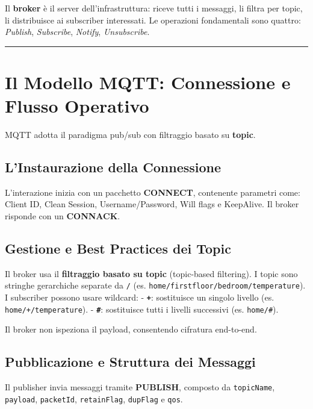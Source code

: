 \documentclass[
  italian,
  openany]{book}
\begin{document}
Il \textbf{broker} è il server dell'infrastruttura: riceve tutti i
messaggi, li filtra per topic, li distribuisce ai subscriber
interessati. Le operazioni fondamentali sono quattro: \emph{Publish},
\emph{Subscribe}, \emph{Notify}, \emph{Unsubscribe}.

\begin{center}\rule{0.5\linewidth}{0.5pt}\end{center}

\section{Il Modello MQTT: Connessione e Flusso
Operativo}\label{il-modello-mqtt-connessione-e-flusso-operativo}

MQTT adotta il paradigma pub/sub con filtraggio basato su
\textbf{topic}.

\subsection{L'Instaurazione della
Connessione}\label{linstaurazione-della-connessione}

L'interazione inizia con un pacchetto \textbf{CONNECT}, contenente
parametri come: Client ID, Clean Session, Username/Password, Will flags
e KeepAlive. Il broker risponde con un \textbf{CONNACK}.

\subsection{Gestione e Best Practices dei
Topic}\label{gestione-e-best-practices-dei-topic}

Il broker usa il \textbf{filtraggio basato su topic} (topic-based
filtering). I topic sono stringhe gerarchiche separate da \texttt{/}
(es. \texttt{home/firstfloor/bedroom/temperature}). I subscriber possono
usare wildcard: - \textbf{\texttt{+}}: sostituisce un singolo livello
(es. \texttt{home/+/temperature}). - \textbf{\texttt{\#}}: sostituisce
tutti i livelli successivi (es. \texttt{home/\#}).

Il broker non ispeziona il payload, consentendo cifratura end-to-end.

\subsection{Pubblicazione e Struttura dei
Messaggi}\label{pubblicazione-e-struttura-dei-messaggi}

Il publisher invia messaggi tramite \textbf{PUBLISH}, composto da
\texttt{topicName}, \texttt{payload}, \texttt{packetId},
\texttt{retainFlag}, \texttt{dupFlag} e \texttt{qos}.
\end{document}
